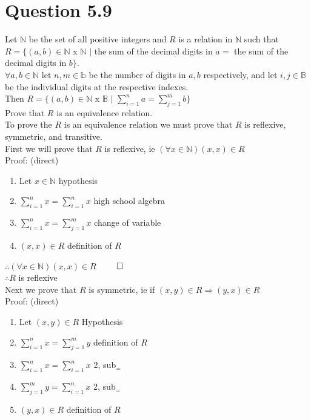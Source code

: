 \documentclass{article}
\begin{document}
	\section{Question 5.9}
		Let $\mathbb{N}$ be the set of all positive integers and $R$ is a relation in $\mathbb{N}$ such that \\
		$R = \{(a, b) \in \mathbb{N}$ x $\mathbb{N}$ $|$ the sum of the decimal digits in $a =$ the sum of the decimal digits in $b\}$. \\
		$\forall a, b \in \mathbb{N}$ let $n, m \in \mathbb{b}$ be the number of digits in $a, b$ respectively, and let $i, j \in \mathbb{B}$ be the individual digits at the respective indexes. \\
		Then $R = \{(a, b) \in \mathbb{N}$ x $\mathbb{B}$ $|$ $\sum\limits_{i = 1}^{n} a = \sum\limits_{j = 1}^{m} b\}$ \\
		Prove that $R$ is an equivalence relation. \\
		To prove the $R$ is an equivalence relation we must prove that $R$ is reflexive, symmetric, and transitive. \\
		First we will prove that $R$ is reflexive, ie $(\forall x \in \mathbb{N}) (x, x) \in R$ \\
		Proof: (direct)
		\begin{enumerate}
			\item Let $x \in \mathbb{N}$ \hfill hypothesis
			\item $\sum\limits_{i = 1}^{n} x = \sum\limits_{i = 1}^{n} x$ \hfill high school algebra
			\item $\sum\limits_{i = 1}^{n} x = \sum\limits_{j = 1}^{m} x$ \hfill change of variable
			\item $(x, x) \in R$ \hfill definition of $R$
		\end{enumerate}
		$\therefore (\forall x \in \mathbb{N}) (x, x) \in R$ \hfill $\qed$ \\
		$\therefore R$ is reflexive \\
		Next we prove that $R$ is symmetric, ie if $(x, y) \in R \Rightarrow (y, x) \in R$ \\
		Proof: (direct)
		\begin{enumerate}
			\item Let $(x, y) \in R$ \hfill Hypothesis
			\item $\sum\limits_{i = 1}^{n} x = \sum\limits_{j = 1}^{m} y$ \hfill definition of $R$
			\item $\sum\limits_{i = 1}^{n} x = \sum\limits_{i = 1}^{n} x$ \hfill 2, sub$_{=}$
			\item $\sum\limits_{j = 1}^{m} y = \sum\limits_{i = 1}^{n} x$ \hfill 2, sub$_{=}$
			\item $(y, x) \in R$ \hfill definition of $R$
		\end{enumerate}
\end{document}
